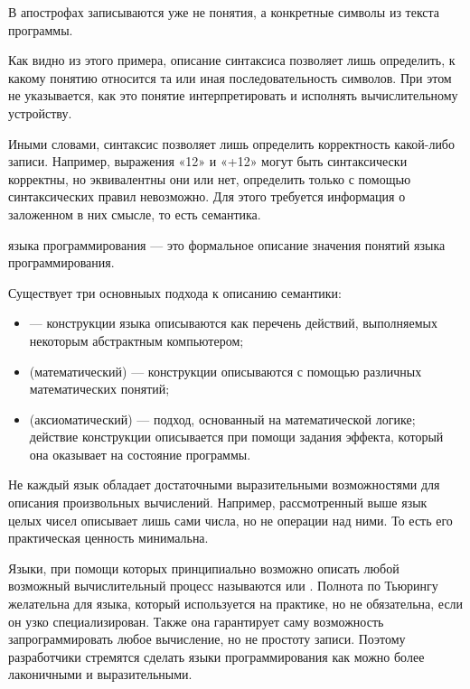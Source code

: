 В апострофах записываются уже не понятия, а конкретные символы из
текста программы.

Как видно из этого примера, описание синтаксиса позволяет лишь
определить, к какому понятию относится та или иная последовательность
символов.  При этом не указывается, как это понятие интерпретировать и
исполнять вычислительному устройству.

Иными словами, синтаксис позволяет лишь определить корректность какой-либо
записи. Например, выражения «12» и «+12» могут быть синтаксически
корректны, но эквивалентны они или нет, определить только с помощью
синтаксических правил невозможно. Для этого требуется информация о
заложенном в них смысле, то есть семантика.

\begin{defn}
 языка программирования — это формальное описание
значения понятий языка программирования.
\end{defn}

Существует три основныых подхода к описанию семантики:

\begin{itemize}
\item {} — конструкции языка
  описываются как перечень действий, выполняемых некоторым абстрактным
  компьютером;
\item {} (математический) —
  конструкции описываются с помощью различных математических понятий;
\item {} (аксиоматический)
  — подход, основанный на математической логике; действие конструкции
  описывается при помощи задания эффекта, который она оказывает на
  состояние программы.
\end{itemize}

Не каждый язык обладает достаточными выразительными возможностями для
описания произвольных вычислений. Например, рассмотренный выше язык
целых чисел описывает лишь сами числа, но не операции над ними. То
есть его практическая ценность минимальна.

Языки, при помощи которых принципиально возможно описать любой
возможный вычислительный процесс называются  или
. Полнота по Тьюрингу
желательна для языка, который используется на практике, но не
обязательна, если он узко специализирован. Также она гарантирует саму
возможность запрограммировать любое вычисление, но не простоту записи.
Поэтому разработчики стремятся сделать языки программирования как
можно более лаконичными и выразительными.


